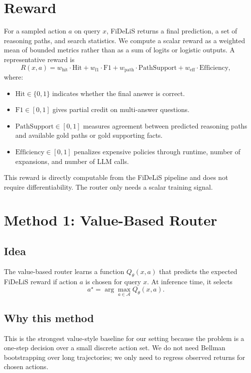 \documentclass[11pt]{article}
\begin{document}
\section{Reward}
For a sampled action $a$ on query $x$, FiDeLiS returns a final prediction, a set of reasoning paths, and search statistics. We compute a scalar reward as a weighted mean of bounded metrics rather than as a sum of logits or logistic outputs. A representative reward is
\[
R(x,a) =
w_{\text{hit}} \cdot \mathrm{Hit}
+ w_{\text{f1}} \cdot \mathrm{F1}
+ w_{\text{path}} \cdot \mathrm{PathSupport}
+ w_{\text{eff}} \cdot \mathrm{Efficiency},
\]
where:
\begin{itemize}[leftmargin=1.5em]
\item $\mathrm{Hit} \in \{0,1\}$ indicates whether the final answer is correct.
\item $\mathrm{F1} \in [0,1]$ gives partial credit on multi-answer questions.
\item $\mathrm{PathSupport} \in [0,1]$ measures agreement between predicted reasoning paths and available gold paths or gold supporting facts.
\item $\mathrm{Efficiency} \in [0,1]$ penalizes expensive policies through runtime, number of expansions, and number of LLM calls.
\end{itemize}

This reward is directly computable from the FiDeLiS pipeline and does not require differentiability. The router only needs a scalar training signal.

\section{Method 1: Value-Based Router}
\subsection{Idea}
The value-based router learns a function $Q_\theta(x,a)$ that predicts the expected FiDeLiS reward if action $a$ is chosen for query $x$. At inference time, it selects
\[
a^\star = \arg\max_{a \in \mathcal{A}} Q_\theta(x,a).
\]

\subsection{Why this method}
This is the strongest value-style baseline for our setting because the problem is a one-step decision over a small discrete action set. We do not need Bellman bootstrapping over long trajectories; we only need to regress observed returns for chosen actions.
\end{document}
